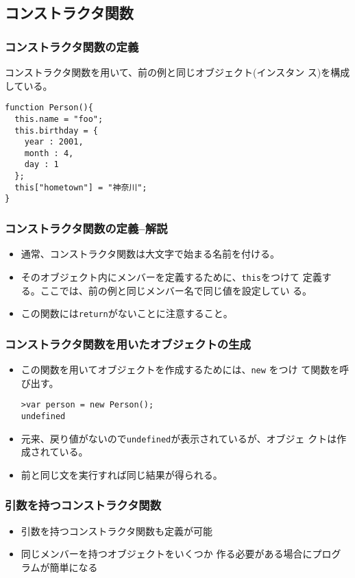 \subsection{コンストラクタ関数}
\begin{frame}[containsverbatim]
\frametitle{コンストラクタ関数の定義}
コンストラクタ関数を用いて、前の例と同じオブジェクト(インスタン
 ス)を構成している。
\begin{Verbatim}
function Person(){
  this.name = "foo";
  this.birthday = {
    year : 2001,
    month : 4,
    day : 1
  };
  this["hometown"] = "神奈川";
}
\end{Verbatim}

\end{frame}
\begin{frame}[containsverbatim]
\frametitle{コンストラクタ関数の定義--解説}
\begin{itemize}
 \item 通常、コンストラクタ関数は大文字で始まる名前を付ける。
 \item そのオブジェクト内にメンバーを定義するために、\Verb+this+をつけて
       定義する。ここでは、前の例と同じメンバー名で同じ値を設定してい
       る。
 \item この関数には\Verb+return+がないことに注意すること。
\end{itemize}
\end{frame}
\begin{frame}[containsverbatim]
\frametitle{コンストラクタ関数を用いたオブジェクトの生成}
\begin{itemize}
 \item この関数を用いてオブジェクトを作成するためには、\Verb+new+ をつけ
       て関数を呼び出す。
\begin{Verbatim}
>var person = new Person();
undefined
\end{Verbatim}
 \item 元来、戻り値がないので\Verb+undefined+が表示されているが、オブジェ
       クトは作成されている。
 \item 前と同じ文を実行すれば同じ結果が得られる。
\end{itemize}
\end{frame}
\begin{frame}[containsverbatim]
\frametitle{引数を持つコンストラクタ関数}
\begin{itemize}
 \item 引数を持つコンストラクタ関数も定義が可能
 \item 同じメンバーを持つオブジェクトをいくつか
 作る必要がある場合にプログラムが簡単になる
\end{itemize}
\end{frame}

